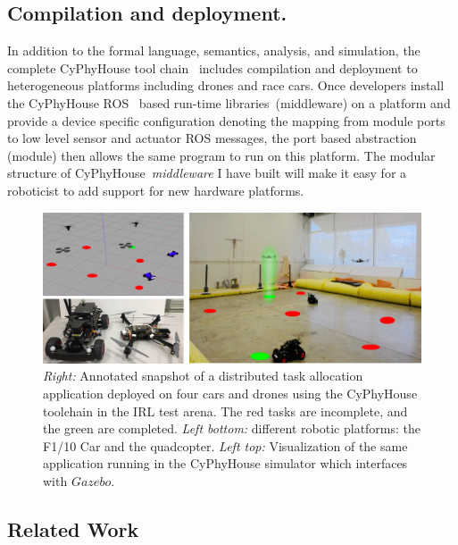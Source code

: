 \subsection{Compilation and deployment.}
In addition to the formal language, semantics, analysis, and simulation,
the complete CyPhyHouse tool chain~\cite{ghosh2019cyphyhouse} includes compilation and deployment to heterogeneous platforms including drones and race cars.
Once developers install the CyPhyHouse ROS~\cite{ros} based run-time libraries~(middleware) on a platform
and provide a device specific configuration denoting the mapping from \lgname module ports
to low level sensor and actuator ROS messages,
the port based abstraction (module) then allows the same \lgname program to run on this platform. The modular structure
 of CyPhyHouse\ {\em middleware\/} I have built will make it easy for a roboticist to add support for new hardware platforms. 
  \begin{figure}[h!] 
    \centering
    \includegraphics[width=\textwidth]{figs/irl-platform.png}
    \vspace{0.1cm}
 \caption{\small \emph{Right:} Annotated snapshot of a distributed task allocation application deployed on four cars and drones using the CyPhyHouse toolchain in the IRL test arena. The red tasks are incomplete, and the green are completed. {\em Left bottom:\/}  different robotic platforms: the F1/10 Car and the quadcopter.  \emph{Left top:\/} Visualization of the same application running in the CyPhyHouse simulator which interfaces with $\mathit{Gazebo}$.}
  \label{fig:realvis}
\end{figure}

\subsection{Related Work}

